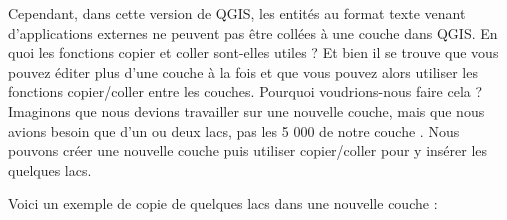 \begin{itemize}
Cependant, dans cette version de QGIS, les entités au format texte venant d'applications externes ne peuvent pas être collées à une couche dans QGIS. En quoi les fonctions copier et coller sont-elles utiles ? Et bien il se trouve que vous pouvez éditer plus d'une couche à la fois et que vous pouvez alors utiliser les fonctions copier/coller entre les couches. Pourquoi voudrions-nous faire cela ? Imaginons que nous devions travailler sur une nouvelle couche, mais que nous avions besoin que d'un ou deux lacs, pas les 5 000 de notre couche . Nous pouvons créer une nouvelle couche puis utiliser copier/coller pour y insérer les quelques lacs.

Voici un exemple de copie de quelques lacs dans une nouvelle couche :


\end{itemize}
